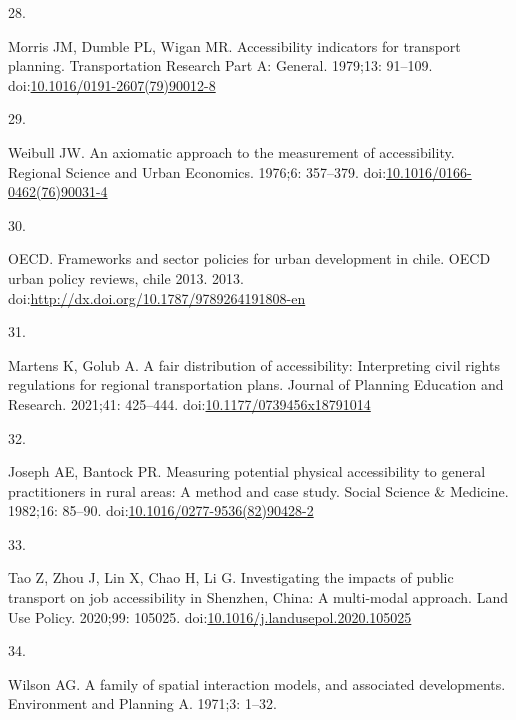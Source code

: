 \documentclass[10pt,letterpaper]{article}
\newlength{\cslhangindent}
\newlength{\csllabelwidth}
\newlength{\cslentryspacingunit} %
\newenvironment{CSLReferences}[2] %
 {%
  \setlength{\parindent}{0pt}
  \ifodd #1
  \let\oldpar\par
  \def\par{\hangindent=\cslhangindent\oldpar}
  \fi
  \setlength{\parskip}{#2\cslentryspacingunit}
 }%
 {}
\newcommand{\CSLLeftMargin}[1]{\parbox[t]{\csllabelwidth}{#1}}
\newcommand{\CSLRightInline}[1]{\parbox[t]{\linewidth - \csllabelwidth}{#1}\break}
\begin{document}
\begin{CSLReferences}{0}{0}
\leavevmode{}%
\CSLLeftMargin{28. }%
\CSLRightInline{Morris JM, Dumble PL, Wigan MR. Accessibility indicators
for transport planning. Transportation Research Part A: General.
1979;13: 91--109.
doi:\href{https://doi.org/10.1016/0191-2607(79)90012-8}{10.1016/0191-2607(79)90012-8}}

\leavevmode{}%
\CSLLeftMargin{29. }%
\CSLRightInline{Weibull JW. An axiomatic approach to the measurement of
accessibility. Regional Science and Urban Economics. 1976;6: 357--379.
doi:\href{https://doi.org/10.1016/0166-0462(76)90031-4}{10.1016/0166-0462(76)90031-4}}

\leavevmode{}%
\CSLLeftMargin{30. }%
\CSLRightInline{OECD. Frameworks and sector policies for urban
development in chile. OECD urban policy reviews, chile 2013. 2013.
doi:\url{http://dx.doi.org/10.1787/9789264191808-en}}

\leavevmode{}%
\CSLLeftMargin{31. }%
\CSLRightInline{Martens K, Golub A. A fair distribution of
accessibility: Interpreting civil rights regulations for regional
transportation plans. Journal of Planning Education and Research.
2021;41: 425--444.
doi:\href{https://doi.org/10.1177/0739456x18791014}{10.1177/0739456x18791014}}

\leavevmode{}%
\CSLLeftMargin{32. }%
\CSLRightInline{Joseph AE, Bantock PR. Measuring potential physical
accessibility to general practitioners in rural areas: A method and case
study. Social Science \& Medicine. 1982;16: 85--90.
doi:\href{https://doi.org/10.1016/0277-9536(82)90428-2}{10.1016/0277-9536(82)90428-2}}

\leavevmode{}%
\CSLLeftMargin{33. }%
\CSLRightInline{Tao Z, Zhou J, Lin X, Chao H, Li G. Investigating the
impacts of public transport on job accessibility in {Shenzhen}, {China}:
A multi-modal approach. Land Use Policy. 2020;99: 105025.
doi:\href{https://doi.org/10.1016/j.landusepol.2020.105025}{10.1016/j.landusepol.2020.105025}}

\leavevmode{}%
\CSLLeftMargin{34. }%
\CSLRightInline{Wilson AG. A family of spatial interaction models, and
associated developments. Environment and Planning A. 1971;3: 1--32. }


\end{CSLReferences}
\end{document}
